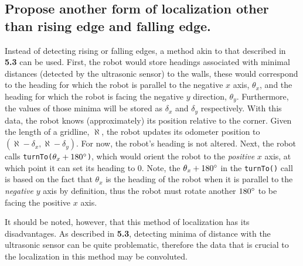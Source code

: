 \documentclass[11pt]{article}
\begin{document}
\subsection{Propose another form of localization other than rising edge and falling edge.}
\par Instead of detecting rising or falling edges, a method akin to that described in \textbf{5.3}
can be used. First, the robot would store headings associated with minimal distances (detected by
the ultrasonic sensor) to the walls, these would correspond to the heading for which the robot is
parallel to the negative $x$ axis, $\theta_x$, and the heading for which the robot is facing the
negative $y$ direction, $\theta_y$. Furthermore, the values of those minima will be stored as
$\delta_x$ and $\delta_y$ respectively. With this data, the robot knows (approximately) its position
relative to the corner. Given the length of a gridline, $\aleph$, the robot updates its odometer
position to $(\aleph - \delta_x,\aleph - \delta_y)$. For now, the robot's heading is not
altered. Next, the robot calls \texttt{turnTo($\theta_x
+ 180 \degree$)}, which would orient the robot to the \textit{positive} $x$ axis, at which point it
can set its heading to 0. Note, the $\theta_x + 180\degree$ in the \texttt{turnTo()} call is based
on the fact that $\theta_x$ is the heading of the robot when it is parallel to the \textit{negative}
$y$ axis by definition, thus the robot must rotate another $180\degree$ to be facing the positive
$x$ axis.
\par It should be noted, however, that this method of localization has its disadvantages. As
described in \textbf{5.3}, detecting minima of distance with the ultrasonic sensor can be quite
problematic, therefore the data that is crucial to the localization in this method may be convoluted.
\end{document}
